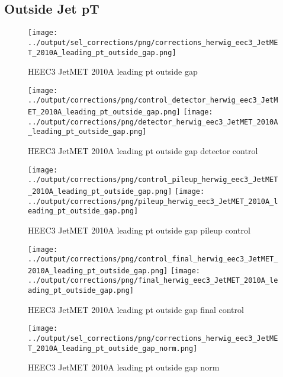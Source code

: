 \documentclass[11pt]{book}
\begin{document}
\clearpage
\subsection{Outside Jet pT}
\begin{figure}[ht]
\centering
\texttt{[image: ../output/sel\_corrections/png/corrections\_herwig\_eec3\_JetMET\_2010A\_leading\_pt\_outside\_gap.png]}
\caption{HEEC3 JetMET 2010A leading pt outside gap}
\label{fig:HEEC3_JetMET_2010A_leading_pt_outside_gap}
\end{figure}

\begin{figure}[ht]
\centering
\texttt{[image: ../output/corrections/png/control\_detector\_herwig\_eec3\_JetMET\_2010A\_leading\_pt\_outside\_gap.png]}
\texttt{[image: ../output/corrections/png/detector\_herwig\_eec3\_JetMET\_2010A\_leading\_pt\_outside\_gap.png]}
\caption{HEEC3 JetMET 2010A leading pt outside gap detector control}
\label{fig:HEEC3_JetMET_2010A_leading_pt_outside_gap_detector_control}
\end{figure}

\begin{figure}[ht]
\centering
\texttt{[image: ../output/corrections/png/control\_pileup\_herwig\_eec3\_JetMET\_2010A\_leading\_pt\_outside\_gap.png]}
\texttt{[image: ../output/corrections/png/pileup\_herwig\_eec3\_JetMET\_2010A\_leading\_pt\_outside\_gap.png]}
\caption{HEEC3 JetMET 2010A leading pt outside gap pileup control}
\label{fig:HEEC3_JetMET_2010A_leading_pt_outside_gap_pileup_control}
\end{figure}


\begin{figure}[ht]
\centering
\texttt{[image: ../output/corrections/png/control\_final\_herwig\_eec3\_JetMET\_2010A\_leading\_pt\_outside\_gap.png]}
\texttt{[image: ../output/corrections/png/final\_herwig\_eec3\_JetMET\_2010A\_leading\_pt\_outside\_gap.png]}
\caption{HEEC3 JetMET 2010A leading pt outside gap final control}
\label{fig:HEEC3_JetMET_2010A_leading_pt_outside_gap_final_control}
\end{figure}



\begin{figure}[ht]
\centering
\texttt{[image: ../output/sel\_corrections/png/corrections\_herwig\_eec3\_JetMET\_2010A\_leading\_pt\_outside\_gap\_norm.png]}
\caption{HEEC3 JetMET 2010A leading pt outside gap norm}
\label{fig:HEEC3_JetMET_2010A_leading_pt_outside_gap_norm}
\end{figure}
\end{document}
